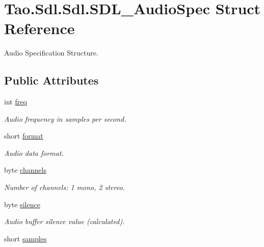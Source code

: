 \hypertarget{struct_tao_1_1_sdl_1_1_sdl_1_1_s_d_l___audio_spec}{
\section{Tao.Sdl.Sdl.SDL\_\-AudioSpec Struct Reference}
\label{struct_tao_1_1_sdl_1_1_sdl_1_1_s_d_l___audio_spec}
}


Audio Specification Structure.  


\subsection*{Public Attributes}
\begin{DoxyCompactItemize}
\item 
int \hyperlink{struct_tao_1_1_sdl_1_1_sdl_1_1_s_d_l___audio_spec_accf2ed95d8ef088316da149bfa982216}{freq}
\begin{DoxyCompactList}\small\item\em Audio frequency in samples per second. \item\end{DoxyCompactList}\item 
short \hyperlink{struct_tao_1_1_sdl_1_1_sdl_1_1_s_d_l___audio_spec_a28a9068099e405056e0ffad5eb6677f9}{format}
\begin{DoxyCompactList}\small\item\em Audio data format. \item\end{DoxyCompactList}\item 
byte \hyperlink{struct_tao_1_1_sdl_1_1_sdl_1_1_s_d_l___audio_spec_a36913675d6c995183e7653f9925bd5ef}{channels}
\begin{DoxyCompactList}\small\item\em Number of channels: 1 mono, 2 stereo. \item\end{DoxyCompactList}\item 
byte \hyperlink{struct_tao_1_1_sdl_1_1_sdl_1_1_s_d_l___audio_spec_ac88a22044c9fea1ef170a7b153015f25}{silence}
\begin{DoxyCompactList}\small\item\em Audio buffer silence value (calculated). \item\end{DoxyCompactList}\item 
short \hyperlink{struct_tao_1_1_sdl_1_1_sdl_1_1_s_d_l___audio_spec_afa691595ab4d7ca52143e9e79bf480dd}{samples}

\end{DoxyCompactItemize}
